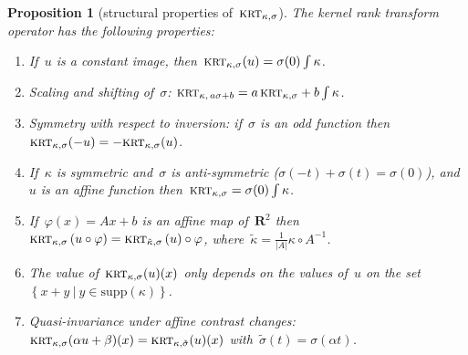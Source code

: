 \documentclass[12pt]{article}                  %
\newtheorem{proposition}{Proposition}
\begin{document}

\begin{proposition}[structural properties of~$\textsc{krt}_{\kappa,\sigma}$]
	The kernel rank transform operator has the following properties:
	\begin{enumerate}
		\item[\bf P1] If~$u$ is a constant image,
			then~$\textsc{krt}_{\kappa,\sigma}(u)=\sigma(0)\int\kappa$.
		\item[\bf P2] Scaling and shifting of~$\sigma$:
			$\textsc{krt}_{\kappa,\,a\sigma+b}=a\,\textsc{krt}_{\kappa,\sigma}+b\int\kappa$.
		\item[\bf P3] Symmetry with respect to inversion: if~$\sigma$
			is an odd function
			then~$\textsc{krt}_{\kappa,\sigma}(-u)=-\textsc{krt}_{\kappa,\sigma}(u)$.
		\item[\bf P4] If~$\kappa$ is symmetric and~$\sigma$ is
			anti-symmetric ($\sigma(-t)+\sigma(t)=\sigma(0)$),
			and~$u$ is an affine function
			then~$\textsc{krt}_{\kappa,\sigma}=\sigma(0)\int\kappa$.
		\item[\bf P5] If~$\varphi(x)=Ax+b$ is an affine map
			of~$\mathbf{R}^2$
			then\\
			$\displaystyle
			\textsc{krt}_{\kappa,\sigma}\left(u\circ\varphi\right) =
			\textsc{krt}_{\tilde\kappa,\sigma}\left(u\right)\circ\varphi$,
			where~$\tilde\kappa=\frac1{|A|}\kappa\circ A^{-1}$.
		\item[\bf P6] The value of~$\textsc{krt}_{\kappa,\sigma}(u)(x)$
			only depends on the values of~$u$ on the
			set~$\left\{x+y\ |\ y\in\mathrm{supp}(\kappa)\right\}$.
		\item[\bf P7] Quasi-invariance under affine contrast changes:
		$\textsc{krt}_{\kappa,\sigma}(\alpha u+\beta)(x)
		=
		\textsc{krt}_{\kappa,\tilde\sigma}(u)(x)
		$
		with~$\tilde\sigma(t)=\sigma(\alpha t)$.
	\end{enumerate}
\end{proposition}
\end{document}
